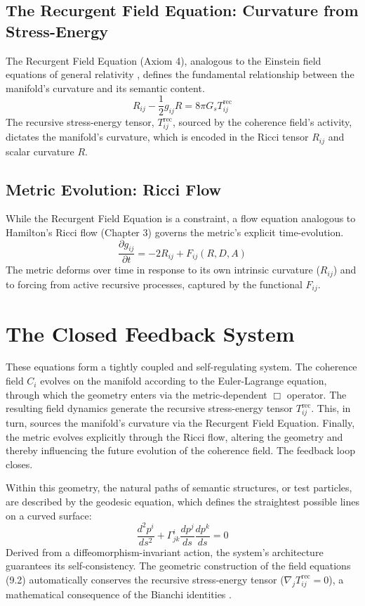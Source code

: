 \subsection{The Recurgent Field Equation: Curvature from Stress-Energy}

The Recurgent Field Equation (Axiom 4), analogous to the Einstein field equations of general relativity \autocite{Einstein1915}, defines the fundamental relationship between the manifold's curvature and its semantic content.
\begin{equation}
R_{ij} - \frac{1}{2}g_{ij}R = 8\pi G_s T^{\text{rec}}_{ij}
\end{equation}
The recursive stress-energy tensor, \(T^{\text{rec}}_{ij}\), sourced by the coherence field's activity, dictates the manifold's curvature, which is encoded in the Ricci tensor \(R_{ij}\) and scalar curvature \(R\).

\subsection{Metric Evolution: Ricci Flow}

While the Recurgent Field Equation is a constraint, a flow equation analogous to Hamilton's Ricci flow (Chapter 3) \autocite{Hamilton1982} governs the metric's explicit time-evolution.
\begin{equation}
\frac{\partial g_{ij}}{\partial t} = -2 R_{ij} + F_{ij}(R, D, A)
\end{equation}
The metric deforms over time in response to its own intrinsic curvature (\(R_{ij}\)) and to forcing from active recursive processes, captured by the functional \(F_{ij}\).

\section{The Closed Feedback System}

These equations form a tightly coupled and self-regulating system. The coherence field \(C_i\) evolves on the manifold according to the Euler-Lagrange equation, through which the geometry enters via the metric-dependent \(\Box\) operator. The resulting field dynamics generate the recursive stress-energy tensor \(T^{\text{rec}}_{ij}\). This, in turn, sources the manifold's curvature via the Recurgent Field Equation. Finally, the metric evolves explicitly through the Ricci flow, altering the geometry and thereby influencing the future evolution of the coherence field. The feedback loop closes.

Within this geometry, the natural paths of semantic structures, or test particles, are described by the geodesic equation, which defines the straightest possible lines on a curved surface:
\begin{equation}
\frac{d^2 p^i}{ds^2} + \Gamma^i_{jk} \frac{dp^j}{ds} \frac{dp^k}{ds} = 0
\end{equation}
Derived from a diffeomorphism-invariant action, the system's architecture guarantees its self-consistency. The geometric construction of the field equations (9.2) automatically conserves the recursive stress-energy tensor ($\nabla_j T^{\text{rec}}_{ij} = 0$), a mathematical consequence of the Bianchi identities \autocite{Bianchi1902}. 